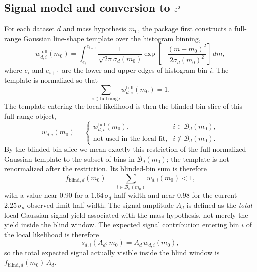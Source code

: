 \subsection{Signal model and conversion to \texorpdfstring{$\varepsilon^2$}{epsilon2}}

For each dataset $d$ and mass hypothesis $m_0$, the package first constructs a
full-range Gaussian line-shape template over the histogram binning,
\begin{equation}
w^{\mathrm{full}}_{d,i}(m_0) =
\int_{e_i}^{e_{i+1}}
\frac{1}{\sqrt{2\pi}\sigma_d(m_0)}
\exp\!\left[-\frac{(m-m_0)^2}{2\sigma_d(m_0)^2}\right]\,dm,
\end{equation}
where $e_i$ and $e_{i+1}$ are the lower and upper edges of histogram bin $i$.
The template is normalized so that
\begin{equation}
\sum_{i \in \mathrm{full\ range}} w^{\mathrm{full}}_{d,i}(m_0) = 1.
\end{equation}
The template entering the local likelihood is then the blinded-bin slice of this
full-range object,
\begin{equation}
w_{d,i}(m_0) =
\begin{cases}
w^{\mathrm{full}}_{d,i}(m_0), & i \in \mathcal{B}_d(m_0), \\
\text{not used in the local fit}, & i \notin \mathcal{B}_d(m_0).
\end{cases}
\label{eq:window-template}
\end{equation}
By the blinded-bin slice we mean exactly this restriction of the full normalized
Gaussian template to the subset of bins in $\mathcal{B}_d(m_0)$; the template is not
renormalized after the restriction.
Its blinded-bin sum is therefore
\begin{equation}
f_{\mathrm{blind},d}(m_0) = \sum_{i \in \mathcal{B}_d(m_0)} w_{d,i}(m_0) < 1,
\end{equation}
with a value near 0.90 for a $1.64\,\sigma_d$ half-width and near 0.98 for the current
$2.25\,\sigma_d$ observed-limit half-width. The signal
amplitude $A_d$ is defined as the \emph{total} local Gaussian signal yield associated
with the mass hypothesis, not merely the yield inside the blind window. The expected
signal contribution entering bin $i$ of the local likelihood is therefore
\begin{equation}
s_{d,i}(A_d;m_0) = A_d\,w_{d,i}(m_0),
\label{eq:signal-bin-contribution}
\end{equation}
so the total expected signal actually visible inside the blind window is
$f_{\mathrm{blind},d}(m_0)\,A_d$.

